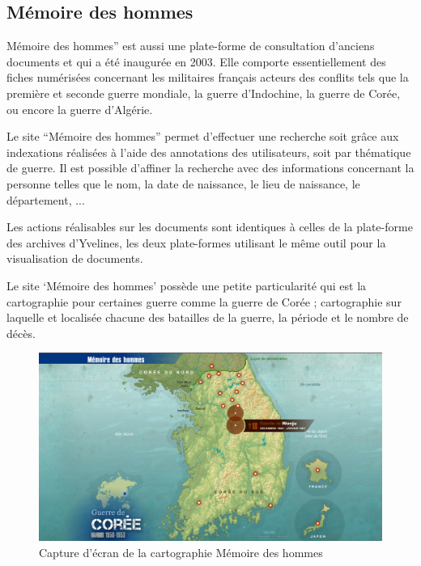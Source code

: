         \subsection{Mémoire des hommes}
        \label{subsec:memoire}
        Mémoire des hommes” est aussi une plate-forme de consultation d’anciens documents
        et qui a été inaugurée en 2003. Elle comporte essentiellement des fiches numérisées concernant
        les militaires français acteurs des conflits tels que la première et seconde guerre mondiale,
        la guerre d’Indochine, la guerre de Corée, ou encore la guerre d’Algérie.

        Le site “Mémoire des hommes” permet d’effectuer une recherche soit grâce aux indexations
        réalisées à l’aide des annotations des utilisateurs, soit par thématique de guerre.
        Il est possible d’affiner la recherche avec des informations concernant la personne telles que le nom,
        la date de naissance, le lieu de naissance, le département, ...

        Les actions réalisables sur les documents sont identiques à celles de la plate-forme
        des archives d’Yvelines, les deux plate-formes utilisant le même outil pour la visualisation
        de documents.

        Le site ‘Mémoire des hommes’ possède une petite particularité qui est la cartographie pour
        certaines guerre comme la guerre de Corée ; cartographie sur laquelle et localisée chacune
        des batailles de la guerre, la période et le nombre de décès.

        \begin{figure}[h!]
            \centering
            \includegraphics[width=1\textwidth]{figure/screen_memoire_hommes.png}
            \caption{Capture d'écran de la cartographie Mémoire des hommes}
            \label{fig:memoire_hommes}
        \end{figure}

